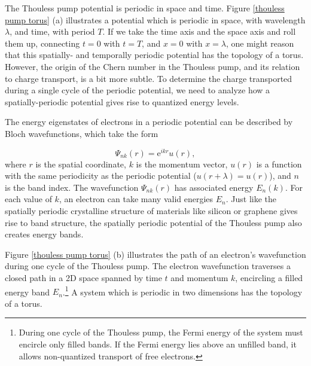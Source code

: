 \documentclass[double,12pt,1in,seploa]{beavtex}
\begin{document}
The Thouless pump potential is periodic in space and time. Figure \ref{thouless pump torus} (a) illustrates a potential which is periodic in space, with wavelength $\lambda$, and time, with period $T$. If we take the time axis and the space axis and roll them up, connecting $t = 0$ with $t = T$, and $x = 0$ with $x = \lambda$, one might reason that this spatially- and temporally periodic potential has the topology of a torus. However, the origin of the Chern number in the Thouless pump, and its relation to charge transport, is a bit more subtle. To determine the charge transported during a single cycle of the periodic potential, we need to analyze how a spatially-periodic potential gives rise to quantized energy levels.

The energy eigenstates of electrons in a periodic potential can be described by Bloch wavefunctions, which take the form

\begin{equation}
    \Psi_{nk}(r) = \mathrm{e}^{ikr}u(r), \label{Bloch's theorem}
\end{equation}
where $r$ is the spatial coordinate, $k$ is the momentum vector, $u(r)$ is a function with the same periodicity as the periodic potential ($u(r+ \lambda) = u(r)$), and $n$ is the band index. The wavefunction $\Psi_{nk}(r)$ has associated energy $E_n(k)$. For each value of $k$, an electron can take many valid energies $E_n$. Just like the spatially periodic crystalline structure of materials like silicon or graphene gives rise to band structure, the spatially periodic potential of the Thouless pump also creates energy bands.

Figure \ref{thouless pump torus} (b) illustrates the path of an electron's wavefunction during one cycle of the Thouless pump. The electron wavefunction traverses a closed path in a 2D space spanned by time $t$ and momentum $k$, encircling a filled energy band $E_n$.\footnote{During one cycle of the Thouless pump, the Fermi energy of the system must encircle only filled bands. If the Fermi energy lies above an unfilled band, it allows non-quantized transport of free electrons.} A system which is periodic in two dimensions has the topology of a torus.
\end{document}
